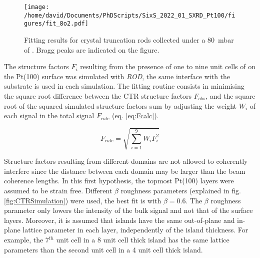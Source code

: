 \begin{figure}[!htb]
    \centering
    \texttt{[image: /home/david/Documents/PhDScripts/SixS\_2022\_01\_SXRD\_Pt100/figures/fit\_8o2.pdf]}
    \caption{
        Fitting results for crystal truncation rods collected under a \qty{80}{\milli\bar} of .
         Bragg peaks are indicated on the figure.
    }
    \label{fig:CTRFitHighOxygen}
\end{figure}

The structure factors $F_i$ resulting from the presence of one to nine unit cells of  on the Pt(100) surface was simulated with \textit{ROD}, the same interface with the substrate is used in each simulation.
The fitting routine consists in minimising the square root difference between the CTR structure factors $F_{obs}$, and the square root of the squared simulated structure factors sum by adjusting the weight $W_i$ of each signal in the total signal $F_{calc}$ (eq. \ref{eq:Fcalc}).

\begin{equation}
    F_{calc} = \sqrt{\sum_{i=1}^{9} W_i F_i^2}
    \label{eq:Fcalc}
\end{equation}

Structure factors resulting from different domains are not allowed to coherently interfere since the distance between each domain may be larger than the beam coherence lengths.
In this first hypothesis, the topmost Pt(100) layers were assumed to be strain free.
Different $\beta$ roughness parameters (explained in fig. \ref{fig:CTRSimulation}) were used, the best fit is with $\beta = \num{0.6}$.
The $\beta$ roughness parameter only lowers the intensity of the bulk signal and not that of the surface layers.
Moreover, it is assumed that  islands have the same out-of-plane and in-plane lattice parameter in each layer, independently of the island thickness.
For example, the 7$^{th}$ unit cell in a \num{8} unit cell thick island has the same lattice parameters than the second unit cell in a \num{4} unit cell thick island.

